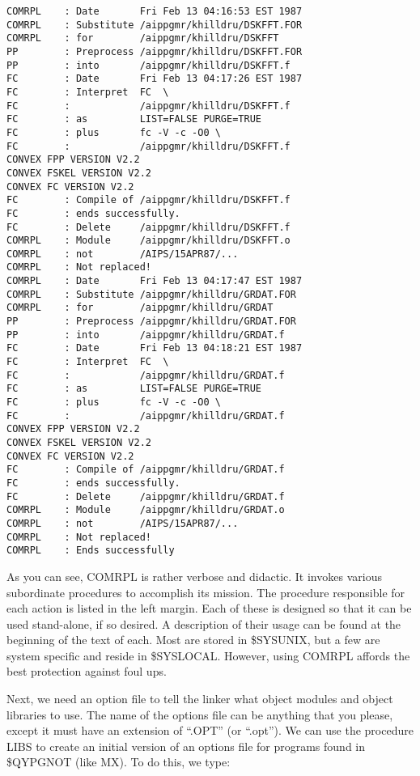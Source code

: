 \begin{verbatim}
COMRPL    : Date       Fri Feb 13 04:16:53 EST 1987
COMRPL    : Substitute /aippgmr/khilldru/DSKFFT.FOR
COMRPL    : for        /aippgmr/khilldru/DSKFFT
PP        : Preprocess /aippgmr/khilldru/DSKFFT.FOR
PP        : into       /aippgmr/khilldru/DSKFFT.f
FC        : Date       Fri Feb 13 04:17:26 EST 1987
FC        : Interpret  FC  \
FC        :            /aippgmr/khilldru/DSKFFT.f
FC        : as         LIST=FALSE PURGE=TRUE
FC        : plus       fc -V -c -O0 \
FC        :            /aippgmr/khilldru/DSKFFT.f
CONVEX FPP VERSION V2.2
CONVEX FSKEL VERSION V2.2
CONVEX FC VERSION V2.2
FC        : Compile of /aippgmr/khilldru/DSKFFT.f
FC        : ends successfully.
FC        : Delete     /aippgmr/khilldru/DSKFFT.f
COMRPL    : Module     /aippgmr/khilldru/DSKFFT.o
COMRPL    : not        /AIPS/15APR87/...
COMRPL    : Not replaced!
COMRPL    : Date       Fri Feb 13 04:17:47 EST 1987
COMRPL    : Substitute /aippgmr/khilldru/GRDAT.FOR
COMRPL    : for        /aippgmr/khilldru/GRDAT
PP        : Preprocess /aippgmr/khilldru/GRDAT.FOR
PP        : into       /aippgmr/khilldru/GRDAT.f
FC        : Date       Fri Feb 13 04:18:21 EST 1987
FC        : Interpret  FC  \
FC        :            /aippgmr/khilldru/GRDAT.f
FC        : as         LIST=FALSE PURGE=TRUE
FC        : plus       fc -V -c -O0 \
FC        :            /aippgmr/khilldru/GRDAT.f
CONVEX FPP VERSION V2.2
CONVEX FSKEL VERSION V2.2
CONVEX FC VERSION V2.2
FC        : Compile of /aippgmr/khilldru/GRDAT.f
FC        : ends successfully.
FC        : Delete     /aippgmr/khilldru/GRDAT.f
COMRPL    : Module     /aippgmr/khilldru/GRDAT.o
COMRPL    : not        /AIPS/15APR87/...
COMRPL    : Not replaced!
COMRPL    : Ends successfully

\end{verbatim}
As you can see, COMRPL is rather verbose and didactic.  It invokes
various subordinate procedures to accomplish its mission.  The
procedure responsible for each action is listed in the left margin.
Each of these is designed so that it can be used stand-alone, if so
desired. A description of their usage can be found at the beginning of
the text of each.  Most are stored in \$SYSUNIX, but a few are system
specific and reside in \$SYSLOCAL.  However, using COMRPL affords the
best protection against foul ups.

Next, we need an option file to tell the linker what object modules
and object libraries to use.  The name of the options file can be
anything that you please, except it must have an extension of ``.OPT''
(or ``.opt'').    We can use the procedure LIBS to create an initial
version of an options file for programs found in \$QYPGNOT (like MX).
To do this, we type:

